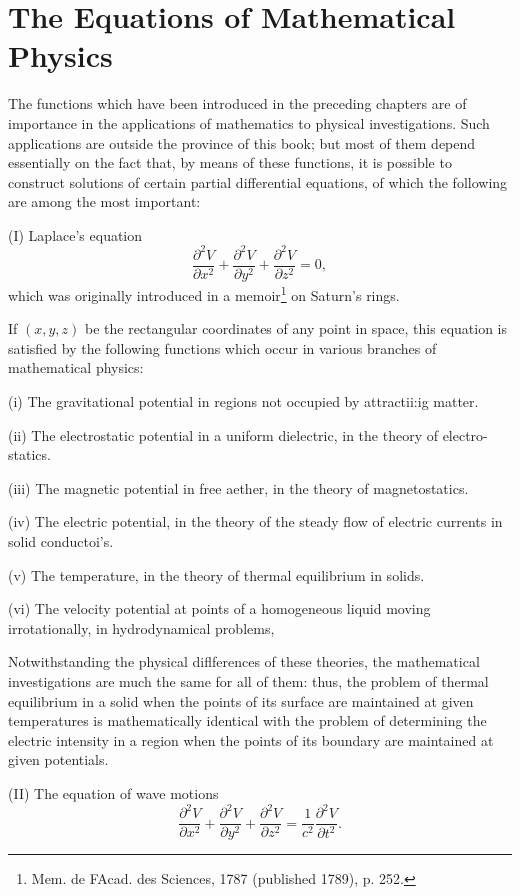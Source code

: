 %
%
\chapter{The Equations of Mathematical Physics}
The functions which have been introduced in the preceding chapters
are of importance in the applications of mathematics to physical
investigations. Such applications are outside the province of this
book; but most of them depend essentially on the fact that, by means
of these functions, it is possible to construct solutions of certain
partial differential equations, of which the following are among the
most important:

(I) Laplace's equation
$$
\frac{\partial^{2} V}{\partial x^{2}} +
\frac{\partial^{2} V}{\partial y^{2}} +
\frac{\partial^{2} V}{\partial z^{2}} =
0,
$$
which was originally introduced in a memoir\footnote{%
  Mem. de FAcad. des Sciences, 1787 (published 1789), p. 252.}
on Saturn's rings.

If $(x, y, z)$ be the rectangular coordinates of any point in
space, this equation is satisfied by the following functions
which occur in various branches of mathematical physics:

(i) The gravitational potential in regions not occupied by
attractii:ig matter.

(ii) The electrostatic potential in a uniform dielectric, in the
theory of electro- statics.

(iii) The magnetic potential in free aether, in the theory of
magnetostatics.

(iv) The electric potential, in the theory of the steady flow of
electric currents in solid conductoi's.

(v) The temperature, in the theory of thermal equilibrium in solids.

(vi) The velocity potential at points of a homogeneous liquid moving
irrotationally, in hydrodynamical problems,

Notwithstanding the physical diflferences of these theories, the
mathematical investigations are much the same for all of them:
thus, the problem of thermal equilibrium in a solid when the points
of its surface are maintained at given temperatures is
mathematically identical with the problem of determining the
electric intensity in a region when the points of its boundary
are maintained at given potentials.

(II) The equation of wave motions
$$
\frac{\partial^{2} V}{\partial x^{2}} +
\frac{\partial^{2} V}{\partial y^{2}} +
\frac{\partial^{2} V}{\partial z^{2}} =
\frac{1}{c^{2}} \frac{\partial^{2} V}{\partial t^{2}}.
$$

